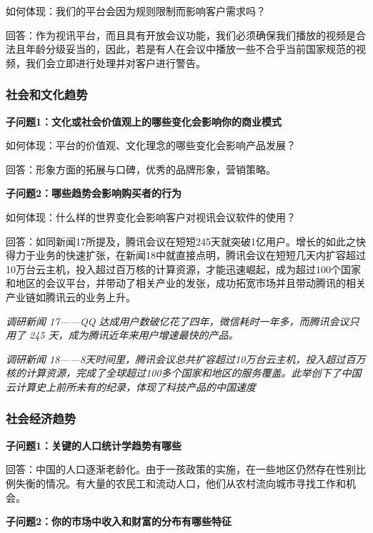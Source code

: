 \documentclass[a4paper,12pt]{article}
\begin{document}
    如何体现：我们的平台会因为规则限制⽽影响客户需求吗？

    回答：作为视讯平台，⽽且具有开放会议功能，我们必须确保我们播放的视频是合法且年龄分级妥当的，因此，若是有⼈在会议中播放⼀些不合乎当前国家规范的视频，我们会⽴即进⾏处理并对客户进⾏警告。

    \subsubsection{社会和文化趋势}    
    \textbf{子问题1：文化或社会价值观上的哪些变化会影响你的商业模式}

    如何体现：平台的价值观、⽂化理念的哪些变化会影响产品发展？

    回答：形象⽅⾯的拓展与⼝碑，优秀的品牌形象，营销策略。

    \textbf{子问题2：哪些趋势会影响购买者的行为}

    如何体现：什么样的世界变化会影响客户对视讯会议软件的使⽤？

    回答：如同新闻17所提及，腾讯会议在短短245天就突破1亿⽤户。增长的如此之快得⼒于业务的快速扩张，在新闻18中就直接点明，腾讯会议在短短⼏天内扩容超过10万台云主机，投⼊超过百万核的计算资源，才能迅速崛起，成为超过100个国家和地区的会议平台，并带动了相关产业的发张，成功拓宽市场并且带动腾讯的相关产业链如腾讯云的业务上升。

    \textit{调研新闻 17——QQ 达成⽤户数破亿花了四年，微信耗时⼀年多，⽽腾讯会议只⽤了 245 天，成为腾讯近年来⽤户增速最快的产品。}
    
    \textit{}

    \textit{调研新闻 18——8天时间⾥，腾讯会议总共扩容超过10万台云主机，投⼊超过百万核的计算资源，完成了全球超过100多个国家和地区的服务覆盖。此举创下了中国云计算史上前所未有的纪录，体现了科技产品的中国速度}
    
    \textit{}
    
    \subsubsection{社会经济趋势}
    \textbf{子问题1：关键的人口统计学趋势有哪些}

    回答：中国的人口逐渐老龄化。由于一孩政策的实施，在一些地区仍然存在性别比例失衡的情况。有大量的农民工和流动人口，他们从农村流向城市寻找工作和机会。

    \textbf{子问题2：你的市场中收入和财富的分布有哪些特征}
\end{document}
